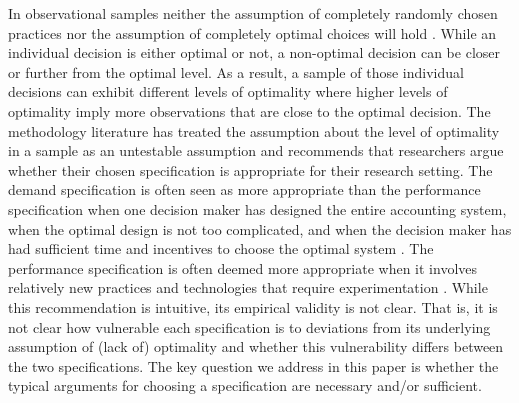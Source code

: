 \documentclass[12pt]{article}
\begin{document}
In observational samples neither the assumption of completely randomly chosen practices nor the assumption of completely optimal choices will hold \citep{brynjolfsson_complementarity_2013}. While an individual decision is either optimal or not, a non-optimal decision can be closer or further from the optimal level. As a result, a sample of those individual decisions can exhibit different levels of optimality where higher levels of optimality imply more observations that are close to the optimal decision. The methodology literature has treated the assumption about the level of optimality in a sample as an untestable assumption and recommends that researchers argue whether their chosen specification is appropriate for their research setting. The demand specification is often seen as more appropriate than the performance specification when one decision maker has designed the entire accounting system, when the optimal design is not too complicated, and when the decision maker has had sufficient time and incentives to choose the optimal system \citep{grabner_management_2013, hofmann_organizational_2017, carree_note_2011, johansson_testing_2018}.  The performance specification is often deemed more appropriate when it involves relatively new practices and technologies that require experimentation \citep{carree_note_2011, bedford_management_2016}. While this recommendation is intuitive, its empirical validity is not clear. That is, it is not clear how vulnerable each specification is to deviations from its underlying assumption of (lack of) optimality and whether this vulnerability differs between the two specifications. The key question we address in this paper is whether the typical arguments for choosing a specification are necessary and/or sufficient.
\end{document}
